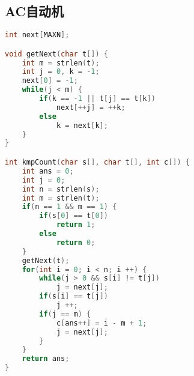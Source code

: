 \subsection{AC自动机}
    \begin{lstlisting}[language=c++]
int next[MAXN];

void getNext(char t[]) {
    int m = strlen(t);
    int j = 0, k = -1;
    next[0] = -1;
    while(j < m) {
        if(k == -1 || t[j] == t[k])
            next[++j] = ++k;
        else 
            k = next[k];
    }
}

int kmpCount(char s[], char t[], int c[]) {
    int ans = 0;
    int j = 0;
    int n = strlen(s);
    int m = strlen(t);
    if(n == 1 && m == 1) {
        if(s[0] == t[0])
            return 1;
        else 
            return 0;
    }
    getNext(t);
    for(int i = 0; i < n; i ++) {
        while(j > 0 && s[i] != t[j])
            j = next[j];
        if(s[i] == t[j])
            j ++;
        if(j == m) {
            c[ans++] = i - m + 1;
            j = next[j];
        }
    }
    return ans;
}
    \end{lstlisting}
